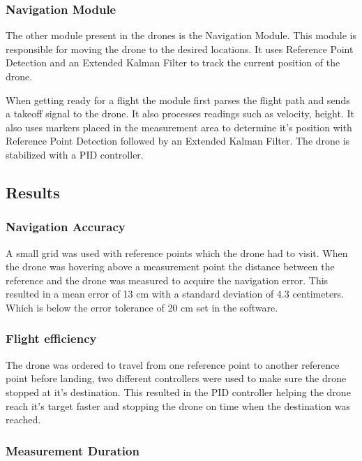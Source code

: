 \documentclass{IEEEtran}
\begin{document}
\subsubsection{Navigation Module}

The other module present in the drones is the Navigation Module. This module is responsible for moving the drone to the desired locations. It uses Reference Point Detection and an Extended Kalman Filter to track the current position of the drone. 

When getting ready for a flight the module first parses the flight path and sends a takeoff signal to the drone. It also processes readings such as velocity, height. It also uses markers placed in the measurement area to determine it's position with Reference Point Detection followed by an Extended Kalman Filter. The drone is stabilized with a PID controller.

\subsection{Results}

\subsubsection{Navigation Accuracy}

A small grid was used with reference points which the drone had to visit. When the drone was hovering above a measurement point the distance between the reference and the drone was measured to acquire the navigation error. This resulted in a mean error of 13 cm with a standard deviation of 4.3 centimeters. Which is below the error tolerance of 20 cm set in the software.

\subsubsection{Flight efficiency}

The drone was ordered to travel from one reference point to another reference point before landing, two different controllers were used to make sure the drone stopped at it's destination. This resulted in the PID controller helping the drone reach it's target faster and stopping the drone on time when the destination was reached.

\subsubsection{Measurement Duration}
\end{document}
